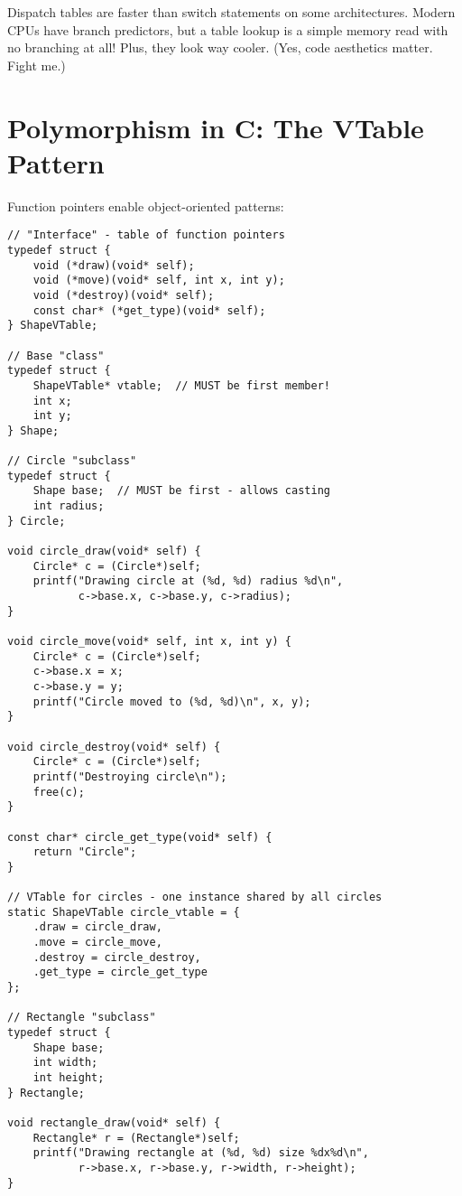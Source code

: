 \begin{tipbox}
Dispatch tables are faster than switch statements on some architectures. Modern CPUs have branch predictors, but a table lookup is a simple memory read with no branching at all! Plus, they look way cooler. (Yes, code aesthetics matter. Fight me.)
\end{tipbox}

\section{Polymorphism in C: The VTable Pattern}

Function pointers enable object-oriented patterns:

\begin{lstlisting}
// "Interface" - table of function pointers
typedef struct {
    void (*draw)(void* self);
    void (*move)(void* self, int x, int y);
    void (*destroy)(void* self);
    const char* (*get_type)(void* self);
} ShapeVTable;

// Base "class"
typedef struct {
    ShapeVTable* vtable;  // MUST be first member!
    int x;
    int y;
} Shape;

// Circle "subclass"
typedef struct {
    Shape base;  // MUST be first - allows casting
    int radius;
} Circle;

void circle_draw(void* self) {
    Circle* c = (Circle*)self;
    printf("Drawing circle at (%d, %d) radius %d\n",
           c->base.x, c->base.y, c->radius);
}

void circle_move(void* self, int x, int y) {
    Circle* c = (Circle*)self;
    c->base.x = x;
    c->base.y = y;
    printf("Circle moved to (%d, %d)\n", x, y);
}

void circle_destroy(void* self) {
    Circle* c = (Circle*)self;
    printf("Destroying circle\n");
    free(c);
}

const char* circle_get_type(void* self) {
    return "Circle";
}

// VTable for circles - one instance shared by all circles
static ShapeVTable circle_vtable = {
    .draw = circle_draw,
    .move = circle_move,
    .destroy = circle_destroy,
    .get_type = circle_get_type
};

// Rectangle "subclass"
typedef struct {
    Shape base;
    int width;
    int height;
} Rectangle;

void rectangle_draw(void* self) {
    Rectangle* r = (Rectangle*)self;
    printf("Drawing rectangle at (%d, %d) size %dx%d\n",
           r->base.x, r->base.y, r->width, r->height);
}


\end{lstlisting}
